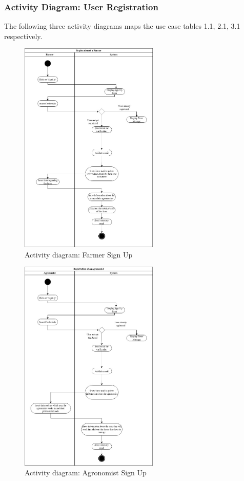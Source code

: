 \documentclass[10pt]{report}
\begin{document}
\subsubsection{Activity Diagram: User Registration}
The following three activity diagrams maps the use case tables 1.1, 2.1, 3.1 respectively.
\begin{figure}[H]
    \centering
    \includegraphics[width=250px]{ActivityDiagrams/FarmerSignUp.jpg}
    \caption{Activity diagram: Farmer Sign Up}
\end{figure}
\begin{figure}[H]
    \centering
    \includegraphics[width=250px]{ActivityDiagrams/AgronomistSignUp.jpg}
    \caption{Activity diagram: Agronomist Sign Up}
\end{figure}
\end{document}
